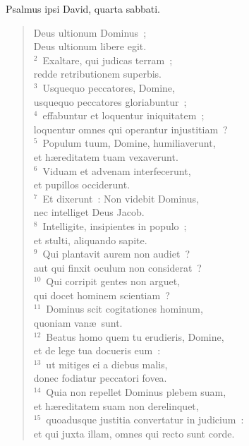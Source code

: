 \lettrine[lines=3,image=true,loversize=0.05,lraise=-0.03]{P}{}salmus ipsi David, quarta sabbati. \begin{flushleft}\begin{verse}\vspace{6pt}Deus ultionum Dominus~;\\ Deus ultionum libere egit.\\
${}^{2}$~Exaltare, qui judicas terram~;\\ redde retributionem superbis.\\
${}^{3}$~Usquequo peccatores, Domine,\\ usquequo peccatores gloriabuntur~;\\
${}^{4}$~effabuntur et loquentur iniquitatem~;\\ loquentur omnes qui operantur injustitiam~?\\
${}^{5}$~Populum tuum, Domine, humiliaverunt,\\ et h\ae reditatem tuam vexaverunt.\\
${}^{6}$~Viduam et advenam interfecerunt,\\ et pupillos occiderunt.\\
${}^{7}$~Et dixerunt~: Non videbit Dominus,\\ nec intelliget Deus Jacob.\\
${}^{8}$~Intelligite, insipientes in populo~;\\ et stulti, aliquando sapite.\\
${}^{9}$~Qui plantavit aurem non audiet~?\\ aut qui finxit oculum non considerat~?\\
${}^{10}$~Qui corripit gentes non arguet,\\ qui docet hominem scientiam~?\\
${}^{11}$~Dominus scit cogitationes hominum,\\ quoniam van\ae\ sunt.\\
${}^{12}$~Beatus homo quem tu erudieris, Domine,\\ et de lege tua docueris eum~:\\
${}^{13}$~ut mitiges ei a diebus malis,\\ donec fodiatur peccatori fovea.\\
${}^{14}$~Quia non repellet Dominus plebem suam,\\ et h\ae reditatem suam non derelinquet,\\
${}^{15}$~quoadusque justitia convertatur in judicium~:\\ et qui juxta illam, omnes qui recto sunt corde.\\

\end{verse}
\end{flushleft}
